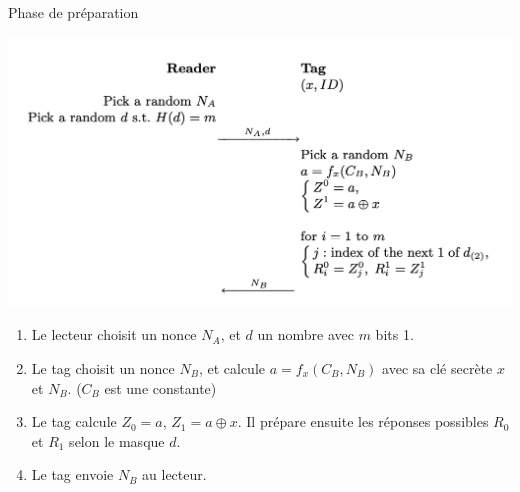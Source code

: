 \documentclass[aspectratio=169]{beamer}
\begin{document}
\begin{frame}{Phase de préparation}
  \begin{multicols}{2}
    \begin{minipage}[c]{\linewidth}
      \centering
      \bigskip
      \medskip
      \includegraphics[width=\linewidth]{../assets/sk-phase1.png}
    \end{minipage}

    \begin{minipage}[t]{\linewidth}
      \begin{enumerate}
        \item Le lecteur choisit un nonce $N_A$, et $d$ un nombre avec $m$ bits 1.
        \item Le tag choisit un nonce $N_B$, et calcule $a = f_x(C_B, N_B)$ avec sa clé secrète $x$ et $N_B$. ($C_B$ est une constante)
        \item Le tag calcule $Z_0 = a$, $Z_1 = a \oplus x$. Il prépare ensuite les réponses possibles $R_0$ et $R_1$ selon le masque $d$.
        \item Le tag envoie $N_B$ au lecteur.
      \end{enumerate}
    \end{minipage}
  \end{multicols}
\end{frame}
\end{document}
